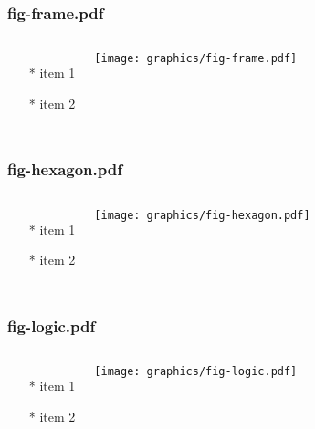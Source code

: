 \documentclass{beamer}
\begin{document}
\begin{frame} \frametitle{fig-frame.pdf}
    \begin{columns}[c]
        \begin{itemize}
            \item[*] item 1
            \item[*] item 2
        \end{itemize}
        \begin{minipage}{\linewidth}
            \begin{center}
            \texttt{[image: graphics/fig-frame.pdf]}
            \label{gfx:fig-frame.pdf}
            \end{center}
        \end{minipage}
    \end{columns}
\end{frame}
\begin{frame} \frametitle{fig-hexagon.pdf}
    \begin{columns}[c]
        \begin{itemize}
            \item[*] item 1
            \item[*] item 2
        \end{itemize}
        \begin{minipage}{\linewidth}
            \begin{center}
            \texttt{[image: graphics/fig-hexagon.pdf]}
            \label{gfx:fig-hexagon.pdf}
            \end{center}
        \end{minipage}
    \end{columns}
\end{frame}
\begin{frame} \frametitle{fig-logic.pdf}
    \begin{columns}[c]
        \begin{itemize}
            \item[*] item 1
            \item[*] item 2
        \end{itemize}
        \begin{minipage}{\linewidth}
            \begin{center}
            \texttt{[image: graphics/fig-logic.pdf]}
            \label{gfx:fig-logic.pdf}
            \end{center}
        \end{minipage}
    \end{columns}
\end{frame}
\end{document}
